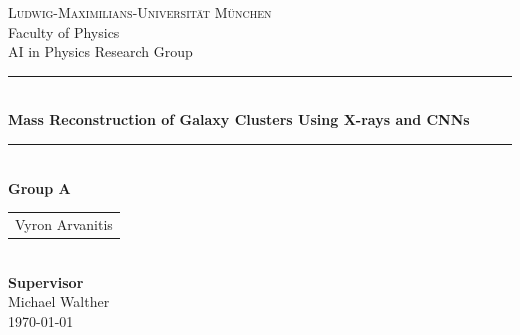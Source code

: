 \documentclass[11pt,a4paper]{article}
\date{\today}
\begin{document}
\begin{titlepage}
    \centering
    
    {\Large\scshape Ludwig-Maximilians-Universität München} \\[0.3cm]
    {\large Faculty of Physics \\ 
    AI in Physics Research Group} \\[1.5cm]
    
    \vspace{0.4cm}
    \rule{\textwidth}{1pt} \\[0.4cm]
    
    {\fontsize{22}{26}\selectfont\bfseries Mass Reconstruction of Galaxy Clusters Using X-rays and CNNs} \\[0.4cm]
    
    \rule{\textwidth}{1pt} \\[1.5cm]
    
    \textbf{Group A} \\[0.3cm]
    \begin{tabular}{c}
        Vyron Arvanitis \\ 
    \end{tabular} \\[2cm]
    
    \textbf{Supervisor} \\[0.3cm]
    Michael Walther \\[1.5cm]
    
    {\large \today}
    
\end{titlepage}




\tableofcontents
\newpage






\newpage
\appendix


\newpage



\end{document}
